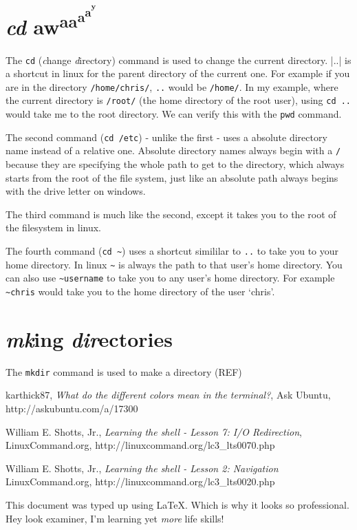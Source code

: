 \documentclass[11pt,twoside,a4paper]{article}
\begin{document}
	\section{\emph{cd} aw\textsuperscript{aa\textsuperscript{a\textsuperscript{a\textsuperscript{\textsuperscript{y}}}}}}

		The \verb|cd| (\emph{c}hange \emph{d}irectory) command is used to change the current directory. \empth|..| is a shortcut in linux for the parent directory of the current one. For example if you are in the directory \verb|/home/chris/|, \verb|..| would be \verb|/home/|. In my example, where the current directory is \verb|/root/| (the home directory of the root user), using \verb|cd ..| would take me to the root directory. We can verify this with the \verb|pwd| command.\cite{lts-navigation}

		The second command (\verb|cd /etc|) - unlike the first - uses a absolute directory name instead of a relative one. Absolute directory names always begin with a \verb|/| because they are specifying the whole path to get to the directory, which always starts from the root of the file system, just like an absolute path always begins with the drive letter on windows.

		The third command is much like the second, except it takes you to the root of the filesystem in linux.

		The fourth command (\verb|cd ~|) uses a shortcut simililar to \verb|..| to take you to your home directory. In linux \verb|~| is always the path to that user's home directory. You can also use \verb|~username| to take you to any user's home directory. For example \verb|~chris| would take you to the home directory of the user `chris'.

	\section{\emph{mk}ing \emph{dir}ectories}

		The \verb|mkdir| command is used to make a directory (REF)

	\newpage
	\begin{thebibliography}{9}

			karthick87,
			\emph{What do the different colors mean in the terminal?},
			Ask Ubuntu,
			http://askubuntu.com/a/17300

			William E. Shotts, Jr.,
			\emph{Learning the shell - Lesson 7: I/O Redirection},
			LinuxCommand.org,
			http://linuxcommand.org/lc3\_lts0070.php

			William E. Shotts, Jr.,
			\emph{Learning the shell - Lesson 2: Navigation}
			LinuxCommand.org,
			http://linuxcommand.org/lc3_lts0020.php
		

	\end{thebibliography}

	\vfill
	This document was typed up using \LaTeX. Which is why it looks so professional. Hey look examiner, I'm learning yet \emph{more} life skills!
\end{document}
